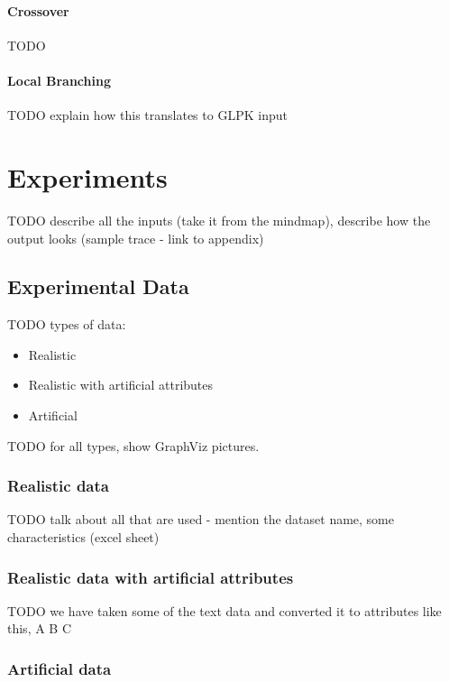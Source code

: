 \documentclass[a4paper,12pt,oneside]{report}
\begin{document}
\subsubsection{Crossover}

TODO

\subsubsection{Local Branching}

TODO explain how this translates to GLPK input

\chapter{Experiments}

TODO describe all the inputs (take it from the mindmap), describe how the output looks (sample trace - link to appendix)

\section{Experimental Data}

TODO types of data:
\begin{itemize}
	\item Realistic 
  \item Realistic with artificial attributes
	\item Artificial
\end{itemize}

TODO for all types, show GraphViz pictures.

\subsection{Realistic data}

TODO talk about all that are used - mention the dataset name, some characteristics (excel sheet)

\subsection{Realistic data with artificial attributes}

TODO we have taken some of the text data and converted it to attributes like this, A B C

\subsection{Artificial data}
\end{document}
